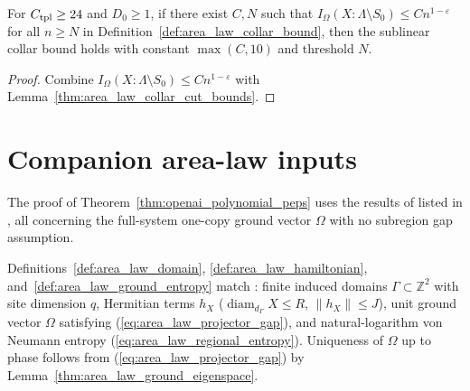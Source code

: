 \begin{lemma}
    \label{thm:area_law_collar_bound_of_information}
    \leanok
    For $C_{\rm tpl}\ge24$ and $D_0\ge1$, if there exist $C,N$ such that
    $I_\Omega(X:\Lambda\setminus S_0)\le Cn^{1-\varepsilon}$ for all $n\ge N$ in
    Definition~\ref{def:area_law_collar_bound}, then the sublinear collar bound
    holds with constant $\max(C,10)$ and threshold $N$.
\end{lemma}
\begin{proof}
    \leanok
    Combine $I_\Omega(X:\Lambda\setminus S_0)\le Cn^{1-\varepsilon}$ with
    Lemma~\ref{thm:area_law_collar_cut_bounds}.
\end{proof}

\section{Companion area-law inputs}
\label{sec:peps_companion_inputs}

The proof of Theorem~\ref{thm:openai_polynomial_peps} uses the results of
\cite{OpenAI2026AreaLaw} listed in \cite[Appendix~A]{OpenAI2026PolynomialPEPS},
all concerning the full-system one-copy ground vector $\Omega$ with no
subregion gap assumption.

\begin{remark}
    \label{rem:peps_companion_model}
    Definitions~\ref{def:area_law_domain}, \ref{def:area_law_hamiltonian},
    and~\ref{def:area_law_ground_entropy} match \cite[Appendix~A]{OpenAI2026PolynomialPEPS}:
    finite induced domains $\Gamma\subset\mathbb Z^2$ with site dimension $q$,
    Hermitian terms $h_X$ ($\operatorname{diam}_{d_\Gamma}X\le R$, $\|h_X\|\le J$),
    unit ground vector $\Omega$ satisfying (\ref{eq:area_law_projector_gap}),
    and natural-logarithm von Neumann entropy (\ref{eq:area_law_regional_entropy}).
    Uniqueness of $\Omega$ up to phase follows from (\ref{eq:area_law_projector_gap})
    by Lemma~\ref{thm:area_law_ground_eigenspace}.
\end{remark}

